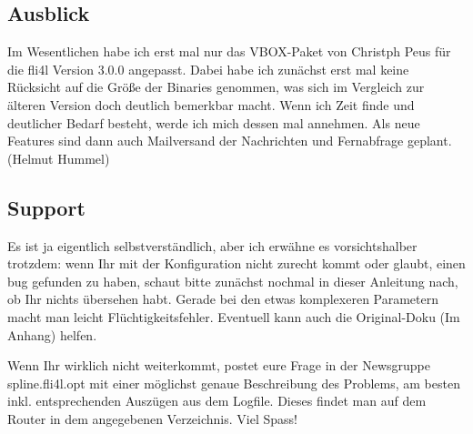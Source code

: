 \subsection{Ausblick}

Im Wesentlichen habe ich erst mal nur das VBOX-Paket von Christph Peus für die fli4l Version 3.0.0
angepasst. Dabei habe ich zunächst erst mal keine Rücksicht auf die Größe der Binaries genommen,
was sich im Vergleich zur älteren Version doch deutlich bemerkbar macht. Wenn ich Zeit finde
und deutlicher Bedarf besteht, werde ich mich dessen mal annehmen. Als neue Features sind dann
auch Mailversand der Nachrichten und Fernabfrage geplant. (Helmut Hummel)

\subsection{Support}

Es ist ja eigentlich selbstverständlich, aber ich erwähne es vorsichtshalber trotzdem: 
wenn Ihr mit der Konfiguration nicht zurecht kommt oder glaubt, einen bug gefunden zu haben, 
schaut bitte zunächst nochmal in dieser Anleitung nach, ob Ihr nichts übersehen habt. 
Gerade bei den etwas komplexeren Parametern macht man leicht Flüchtigkeitsfehler. 
Eventuell kann auch die Original-Doku (Im Anhang) helfen.

Wenn Ihr wirklich nicht weiterkommt, postet eure Frage in der Newsgruppe spline.fli4l.opt mit einer
möglichst genaue Beschreibung des Problems, am besten inkl. entsprechenden Auszügen aus dem Logfile. 
Dieses findet man auf dem Router in dem angegebenen Verzeichnis. 
Viel Spass!
